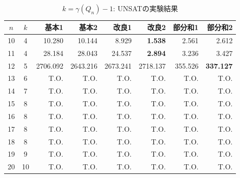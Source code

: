 \begin{table}[t]
 \caption{$k=\gamma(Q_n)-1$: UNSATの実験結果}
 \label{tb:exUNSAT}
 \centering 
 \begin{tabular}{c|c|r|r|r|r|r|r} \hline
  $n$ & $k$ & 基本1 & 基本2 & 改良1 & 改良2 & 部分和1 & 部分和2 \\ \hline
  10 & 4 & 10.280 & 10.144 & 8.929 & \textbf{1.538} & 2.561 & 2.612 \\
  11 & 4 & 28.184 & 28.043 & 24.537 & \textbf{2.894} & 3.236 & 3.427 \\
  12 & 5 & 2706.092 & 2643.216 & 2673.241 & 2718.137 & 355.526 & \textbf{337.127} \\
  13 & 6 & T.O. & T.O. & T.O. & T.O. & T.O. & T.O. \\  
  14 & 7 & T.O. & T.O. & T.O. & T.O. & T.O. & T.O. \\   
  15 & 8 & T.O. & T.O. & T.O. & T.O. & T.O. & T.O. \\  
  16 & 8 & T.O. & T.O. & T.O. & T.O. & T.O. & T.O. \\
  17 & 8 & T.O. & T.O. & T.O. & T.O. & T.O. & T.O. \\
  18 & 8 & T.O. & T.O. & T.O. & T.O. & T.O. & T.O. \\
  19 & 9 & T.O. & T.O. & T.O. & T.O. & T.O. & T.O. \\
  20 & 10 & T.O. & T.O. & T.O. & T.O. & T.O. & T.O. \\ \hline
 \end{tabular}
\end{table}

